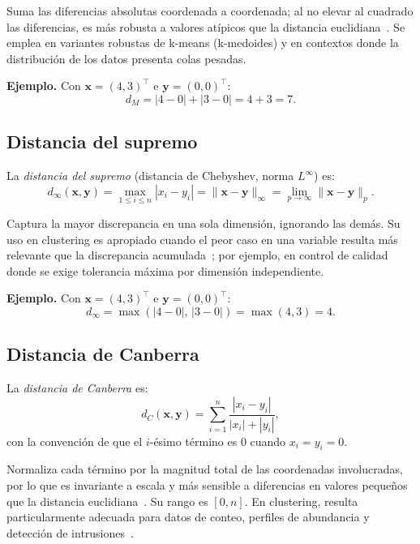 Suma las diferencias absolutas coordenada a coordenada; al no elevar al cuadrado las diferencias, es más robusta a valores atípicos que la distancia euclidiana~\cite{duda2001pattern}. Se emplea en variantes robustas de k-means (k-medoides) y en contextos donde la distribución de los datos presenta colas pesadas.

\textbf{Ejemplo.} Con $\mathbf{x}=(4,3)^{\top}$ e $\mathbf{y}=(0,0)^{\top}$:
\[
d_M = |4-0| + |3-0| = 4 + 3 = 7.
\]

\subsection{Distancia del supremo}

\begin{definition}
La \emph{distancia del supremo} (distancia de Chebyshev, norma $L^\infty$) es:
\[
d_\infty(\mathbf{x},\mathbf{y}) = \max_{1\leq i\leq n}|x_i - y_i| = \|\mathbf{x} - \mathbf{y}\|_\infty = \lim_{p\to\infty}\|\mathbf{x}-\mathbf{y}\|_p.
\]
\end{definition}

Captura la mayor discrepancia en una sola dimensión, ignorando las demás. Su uso en clustering es apropiado cuando el peor caso en una variable resulta más relevante que la discrepancia acumulada~\cite{aggarwal2001surprising}; por ejemplo, en control de calidad donde se exige tolerancia máxima por dimensión independiente.

\textbf{Ejemplo.} Con $\mathbf{x}=(4,3)^{\top}$ e $\mathbf{y}=(0,0)^{\top}$:
\[
d_\infty = \max(|4-0|,\,|3-0|) = \max(4,3) = 4.
\]

\subsection{Distancia de Canberra}

\begin{definition}
La \emph{distancia de Canberra} es:
\[
d_C(\mathbf{x},\mathbf{y}) = \sum_{i=1}^{n}\frac{|x_i - y_i|}{|x_i| + |y_i|},
\]
con la convención de que el $i$-ésimo término es $0$ cuando $x_i = y_i = 0$.
\end{definition}

Normaliza cada término por la magnitud total de las coordenadas involucradas, por lo que es invariante a escala y más sensible a diferencias en valores pequeños que la distancia euclidiana~\cite{emran2002robustness}. Su rango es $[0,n]$. En clustering, resulta particularmente adecuada para datos de conteo, perfiles de abundancia y detección de intrusiones~\cite{emran2002robustness}.

